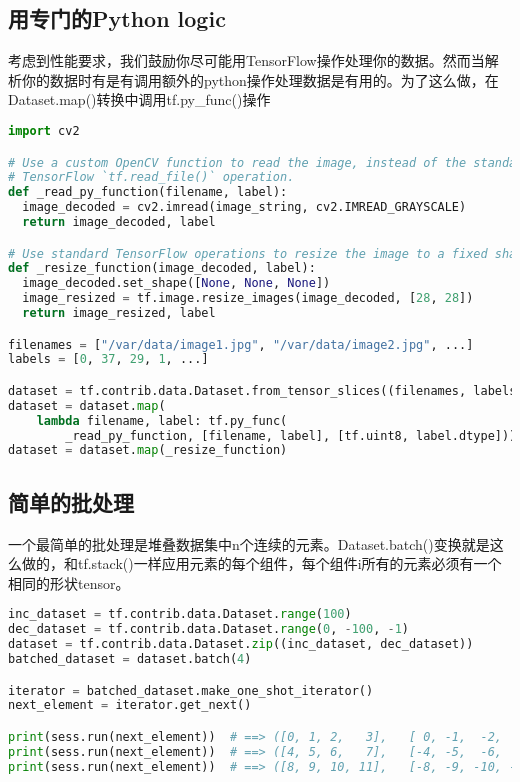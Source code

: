 \subsection{用专门的Python logic}
考虑到性能要求，我们鼓励你尽可能用TensorFlow操作处理你的数据。然而当解析你的数据时有是有调用额外的python操作处理数据是有用的。为了这么做，在Dataset.map()转换中调用tf.py\_func()操作
\begin{lstlisting}[language=Python]
import cv2

# Use a custom OpenCV function to read the image, instead of the standard
# TensorFlow `tf.read_file()` operation.
def _read_py_function(filename, label):
  image_decoded = cv2.imread(image_string, cv2.IMREAD_GRAYSCALE)
  return image_decoded, label

# Use standard TensorFlow operations to resize the image to a fixed shape.
def _resize_function(image_decoded, label):
  image_decoded.set_shape([None, None, None])
  image_resized = tf.image.resize_images(image_decoded, [28, 28])
  return image_resized, label

filenames = ["/var/data/image1.jpg", "/var/data/image2.jpg", ...]
labels = [0, 37, 29, 1, ...]

dataset = tf.contrib.data.Dataset.from_tensor_slices((filenames, labels))
dataset = dataset.map(
    lambda filename, label: tf.py_func(
        _read_py_function, [filename, label], [tf.uint8, label.dtype]))
dataset = dataset.map(_resize_function)
\end{lstlisting}
\subsection{简单的批处理}
一个最简单的批处理是堆叠数据集中n个连续的元素。Dataset.batch()变换就是这么做的，和tf.stack()一样应用元素的每个组件，每个组件i所有的元素必须有一个相同的形状tensor。
\begin{lstlisting}[language=Python]
inc_dataset = tf.contrib.data.Dataset.range(100)
dec_dataset = tf.contrib.data.Dataset.range(0, -100, -1)
dataset = tf.contrib.data.Dataset.zip((inc_dataset, dec_dataset))
batched_dataset = dataset.batch(4)

iterator = batched_dataset.make_one_shot_iterator()
next_element = iterator.get_next()

print(sess.run(next_element))  # ==> ([0, 1, 2,   3],   [ 0, -1,  -2,  -3])
print(sess.run(next_element))  # ==> ([4, 5, 6,   7],   [-4, -5,  -6,  -7])
print(sess.run(next_element))  # ==> ([8, 9, 10, 11],   [-8, -9, -10, -11])
\end{lstlisting}
